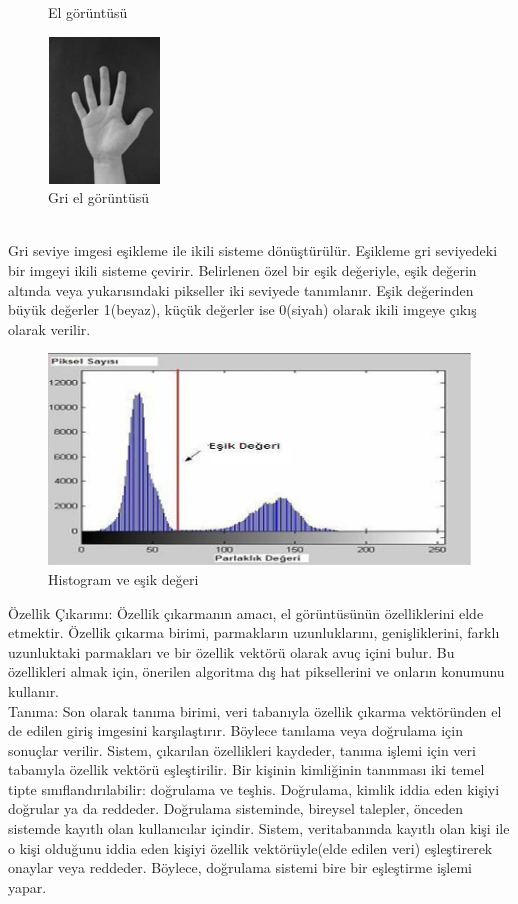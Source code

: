 \documentclass[11pt, a4paper]{article}
\begin{document}
\begin{enumerate}
\begin{enumerate}
\begin{figure}[!h]
			\caption{El görüntüsü}
			\includegraphics{griel.png}
			\caption{Gri el görüntüsü}
		\end{figure}
		\\Gri seviye imgesi eşikleme ile ikili sisteme dönüştürülür. Eşikleme gri seviyedeki bir imgeyi ikili sisteme çevirir. Belirlenen özel bir eşik değeriyle, eşik değerin altında veya yukarısındaki pikseller iki seviyede tanımlanır. Eşik değerinden büyük değerler 1(beyaz), küçük değerler ise 0(siyah) olarak ikili imgeye çıkış olarak verilir.\\
		\begin{figure}[h]
			\centering
			\includegraphics{histogram.png}
			\caption{Histogram ve eşik değeri}
		\end{figure}
		Özellik Çıkarımı: Özellik çıkarmanın amacı, el görüntüsünün özelliklerini elde etmektir. Özellik çıkarma birimi, parmakların uzunluklarını, genişliklerini, farklı uzunluktaki parmakları ve bir özellik vektörü olarak avuç içini bulur.  Bu özellikleri almak için, önerilen algoritma dış hat piksellerini ve onların konumunu kullanır.\\
		
		Tanıma: Son olarak tanıma birimi, veri tabanıyla özellik çıkarma vektöründen el de edilen giriş imgesini karşılaştırır. Böylece tanılama veya doğrulama için sonuçlar verilir.   Sistem, çıkarılan özellikleri kaydeder, tanıma işlemi için veri tabanıyla özellik vektörü eşleştirilir. Bir kişinin kimliğinin tanınması iki temel tipte sınıflandırılabilir: doğrulama ve teşhis. \cite{kong2002palmprint} Doğrulama, kimlik iddia eden kişiyi doğrular ya da reddeder. Doğrulama sisteminde, bireysel talepler, önceden sistemde kayıtlı olan kullanıcılar içindir. Sistem, veritabanında kayıtlı olan kişi ile o kişi olduğunu iddia eden kişiyi özellik vektörüyle(elde edilen veri) eşleştirerek onaylar veya reddeder. Böylece, doğrulama sistemi bire bir eşleştirme işlemi yapar.
		

\end{enumerate}
\end{enumerate}
\end{document}
